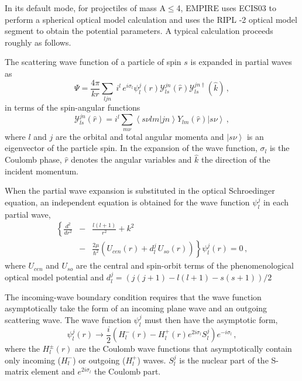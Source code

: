 In its default mode, for projectiles of mass A$\leq$4,  EMPIRE uses ECIS03
to perform a spherical optical model calculation and uses the RIPL%
-2 \cite{RIPL2} optical model segment to obtain the potential
parameters. A typical calculation proceeds roughly as follows.

The scattering wave function of a particle of spin $s$ is expanded in
partial waves as
\begin{equation}
\Psi=%
\frac{4\pi}{kr}\sum_{ljn}\, i^{l}\, e^{i\sigma_{l}}\psi_{l}^{j}(r){\mathcal{Y%
}}_{ls}^{jn}(\hat{r}){\mathcal{Y}}_{ls}^{jn\dagger}(\hat{k})\,,
\label{parwav}
\end{equation}
in terms of the spin-angular functions
\begin{equation}
{\mathcal{Y}}_{ls}^{jn}(\hat{r})=i^{l}\sum_{m\nu}\left\langle s\nu
lm|jn\right\rangle Y_{lm}(\hat{r})\left|s\nu\right\rangle \,,
\end{equation}
where $l$ and $j$ are the orbital and total angular momenta and $%
\left|s\nu\right\rangle $ is an eigenvector of the particle spin. In the
expansion of the wave function, $\sigma_{l}$ is the Coulomb phase, $\hat{r}$
denotes the angular variables and $\hat{k}$ the direction of the incident
momentum.

When the partial wave expansion is substituted in the optical Schroedinger
equation, an independent equation is obtained for the wave function $%
\psi_{l}^{j}$ in each partial wave,
\begin{eqnarray}
\left\{ \frac{d^{2}}{dr^{2}}\right. & - & \frac{l(l+1)}{r^{2}}+k^{2}
\label{eqlj} \\
& - & \left.\frac{2\mu}{\hbar^{2}}\left(U_{cen}(r)+d_{l}^{j}\,
U_{so}(r)\right)\right\} \psi_{l}^{j}(r)=0\,,  \nonumber
\end{eqnarray}
where $U_{cen}$ and $U_{so}$ are the central and spin-orbit terms of the
phenomenological optical model potential and $%
d_{l}^{j}=(j(j+1)-l(l+1)-s(s+1))/2$

The incoming-wave boundary condition requires that the wave function
asymptotically take the form of an incoming plane wave and an outgoing
scattering wave. The wave function $\psi_{l}^{j}$ must then have the
asymptotic form,
\begin{equation}
\psi_{l}^{j}(r)\rightarrow\frac{i}{2}\left(H_{l}^{-}(r)-H_{l}^{+}(r)e^{2i%
\sigma_{l}}S_{l}^{j}\right)e^{-i\sigma_{l}}\,,  \label{exlj}
\end{equation}
where the $H_{l}^{\pm}(r)$ are the Coulomb wave functions that
asymptotically contain only incoming ($H_{l}^{-}$) or outgoing ($H_{l}^{+}$)
waves. $S_{l}^{j}$ is the nuclear part of the S-matrix element and $%
e^{2i\sigma_{l}}$ the Coulomb part.

